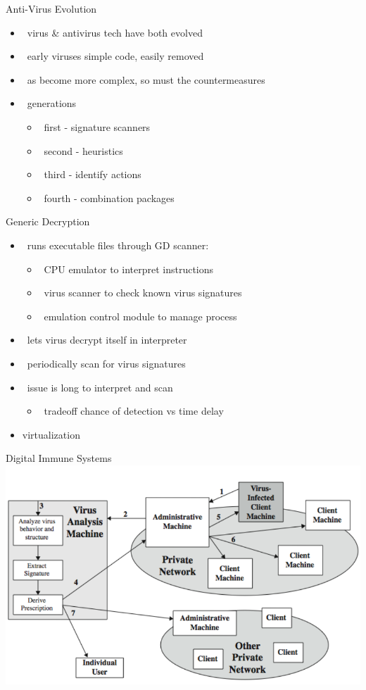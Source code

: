 \documentclass{beamer}
\begin{document}
\begin{frame}{Anti-Virus Evolution }
  \begin{itemize}
  \item  virus \& antivirus tech have both evolved 
  \item  early viruses simple code, easily removed 
  \item  as become more complex, so must the 
    countermeasures 
  \item  generations 
    \begin{itemize}
    \item  first - signature scanners 
    \item  second - heuristics 
    \item  third - identify actions 
    \item  fourth - combination packages 
    \end{itemize}
  \end{itemize}
\end{frame}

\begin{frame}{Generic Decryption }
  \begin{itemize}
  \item  runs executable files through GD scanner: 
    \begin{itemize}
    \item  CPU emulator to interpret instructions 
    \item  virus scanner to check known virus signatures 
    \item  emulation control module to manage process 
    \end{itemize}
  \item  lets virus decrypt itself in interpreter 
  \item  periodically scan for virus signatures 
  \item  issue is long to interpret and scan 
    \begin{itemize}
    \item  tradeoff chance of detection vs time delay
    \end{itemize}
  \item virtualization
  \end{itemize}
\end{frame}

\begin{frame}{Digital Immune Systems}
\includegraphics[width=0.8\linewidth]{digitalImmuneSystem}
\end{frame}
\end{document}
